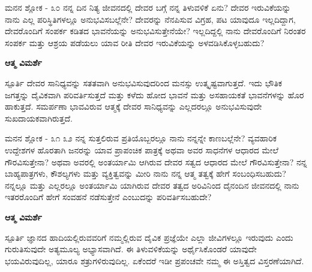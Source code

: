 \newpage
\begin{mananam}{\mananamfont \large{ಮನನ ಶ್ಲೋಕ - ೩೦}}
\mananamtext ನನ್ನ ದಿನ ನಿತ್ಯ ಜೀವನದಲ್ಲಿ ದೇವರ ಬಗ್ಗೆ ನನ್ನ ತಿಳುವಳಿಕೆ ಏನು? ದೇವರ ಇರುವಿಕೆಯನ್ನು  ನಾನು ಎಲ್ಲ ಪರಿಸ್ಥಿತಿಗಳಲ್ಲೂ ಅನುಭವಿಸಬಲ್ಲೆನೇ? ದೇವರನ್ನು ನೆನಪಿಸುವ ವಿಗ್ರಹ, ಪಟ ಯಾವುದೂ ಇಲ್ಲದಿದ್ದಾಗ, ದೇವರೊಂದಿಗೆ ಸಂಪರ್ಕ ಕಡಿತದ ಭಾವನೆಯನ್ನು ಅನುಭವಿಸುತ್ತೇನೆಯೇ? ಇಲ್ಲದಿದ್ದಲ್ಲಿ ನಾನು ದೇವರೊಂದಿಗೆ ನಿರಂತರ ಸಂಪರ್ಕ ಮತ್ತು ಆಶ್ರಯ ಪಡೆಯಲು ಯಾವ ರೀತಿ ದೇವರ ಇರುವಿಕೆಯನ್ನು  ಅಳವಡಿಸಿಕೊಳ್ಳಬಹುದು? 
\end{mananam}
\WritingHand\enspace\textbf{ಆತ್ಮ ವಿಮರ್ಶೆ}\\
\begin{inspiration}{\mananamfont \large ಸ್ಪೂರ್ತಿ}
\mananamtext ದೇವರ ಸಾನಿಧ್ಯವನ್ನು ಸತತವಾಗಿ ಅನುಭವಿಸುವುದರಿಂದ ಮನಸ್ಸು ಉತ್ಕೃಷ್ಟವಾಗುತ್ತದೆ. ಇದು ಭೌತಿಕ ಜಗತ್ತನ್ನು ದೈವಿಕವಾಗಿ ಪರಿವರ್ತಿಸುತ್ತದೆ ಮತ್ತು ಕಳೆದು ಹೋದ ಭಾವನೆ ಮತ್ತು  ಅಸಹಾಯಕತೆ ಭಾವನೆಗಳನ್ನು ಹೊರ ಹಾಕುತ್ತದೆ. ಸಮರ್ಪಣಾ ಭಾವವಿರುವ ಆತ್ಮಕ್ಕೆ ದೇವರ ಸಾನಿಧ್ಯವನ್ನು ಎಲ್ಲದರಲ್ಲೂ ಅನುಭವಿಸುವುದೇ ಸುಖದಾಯಕವಾಗಿರುತ್ತದೆ.
\end{inspiration}
\newpage


\newpage
\begin{mananam}{\mananamfont \large{ಮನನ ಶ್ಲೋಕ - ೩೧ ೩೨}}
\mananamtext ನನ್ನ ಸುತ್ತಲಿರುವ ಪ್ರತಿಯೊಬ್ಬರಲ್ಲೂ ನಾನು ನನ್ನನ್ನೇ ಕಾಣಬಲ್ಲೆನೇ? ವ್ಯವಹಾರಿಕ ಉದ್ದೇಶಗಳ ಹೊರತಾಗಿ ಜನರನ್ನು ಯಾವ ಪ್ರಾಪಂಚಿಕ ಪಾತ್ರಕ್ಕೆ ಅಥವಾ ಅವರ ಸಾಧನೆಗಳ ಆಧಾರದ ಮೇಲೆ ಗೌರವಿಸುತ್ತೇನಾ? ಅಥವಾ ಅವರಲ್ಲಿ ಅಂತರ್ಯಾಮಿ ಆಗಿರುವ ದೇವರ ಸತ್ವದ ಆಧಾರದ ಮೇಲೆ ಗೌರವಿಸುತ್ತೇನಾ? ನನ್ನ ಬಾಹ್ಯಪಾತ್ರಗಳು, ಕೌಶಲ್ಯಗಳು ಮತ್ತು ವ್ಯಕ್ತಿತ್ವವನ್ನು ಮೀರಿ ನಾನು ನನ್ನ ಆತ್ಮ ತತ್ವಕ್ಕೆ ಹೇಗೆ ಸಂಬಂಧಿಸಬಹುದು? ನನ್ನಲ್ಲೂ ಮತ್ತು ಎಲ್ಲರಲ್ಲೂ ಅಂತರ್ಯಾಮಿ ಯಾಗಿರುವ ದೇವರ ತತ್ವದ ಅರಿವಿನಿಂದ ದೈನಂದಿನ ಜೀವನದಲ್ಲಿ ನಾನು ಇತರರೊಂದಿಗೆ ಹೇಗೆ ಸಂವಹನೆ ನಡೆಸುತ್ತೇನೆ ಎಂಬುದನ್ನು ಪರಿವರ್ತಿಸಬಹುದೇ?
\end{mananam}
\WritingHand\enspace\textbf{ಆತ್ಮ ವಿಮರ್ಶೆ}\\
\begin{inspiration}{\mananamfont \large ಸ್ಪೂರ್ತಿ}
\mananamtext ಜ್ಞಾನದ ಹಾದಿಯಲ್ಲಿರುವವರಿಗೆ ನಮ್ಮಲ್ಲಿರುವ ದೈವಿಕ ಪ್ರಜ್ಞೆಯೇ ಎಲ್ಲಾ ಜೀವಿಗಳಲ್ಲೂ ಇರುವುದು ಎಂದು ಗುರುತಿಸುವುದೇ ಅತ್ಯಮೂಲ್ಯ  ಅಭ್ಯಾಸವಾಗಿದೆ. ಈ ತಿಳುವಳಿಕೆಯನ್ನು ಅರ್ಥೈಸಿಕೊಂಡರೆ ಯಾವುದೇ ಭಯವಿರುವುದಿಲ್ಲ, ಯಾರೂ ಶತ್ರುಗಳಿರುವುದಿಲ್ಲ. ಏಕೆಂದರೆ ಇಡೀ ಪ್ರಪಂಚವೇ ನಮ್ಮ ಈ ಅಸ್ತಿತ್ವದ ವಿಸ್ತರಣೆಯಾಗಿದೆ.
\end{inspiration}
\newpage


